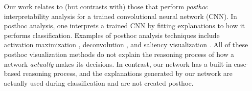 \documentclass{article}
\theoremstyle{definition}
\theoremstyle{remark}
\begin{document}
%
Our work relates to (but contrasts with) those that perform \textit{posthoc} interpretability analysis for a trained convolutional neural network (CNN). In posthoc analysis, one interprets a trained CNN by fitting explanations to how it performs classification.
Examples of posthoc analysis techniques include activation maximization \cite{Erhan,hinton2012practical,lee2009convolutional,Oord16,Nguyen16,simonyan2013deep,Yosinski2015}, deconvolution \cite{ZeilerFe14}, and saliency visualization \cite{simonyan2013deep,pmlr-v70-sundararajan17a,smilkov2017smoothgrad,Selvaraju_2017_ICCV}.
All of these posthoc visualization methods do not explain the reasoning process of how a network \textit{actually} makes its decisions. In contrast, our network has a built-in case-based reasoning process, and the explanations generated by our network are actually used during classification and are not created posthoc.
\end{document}
